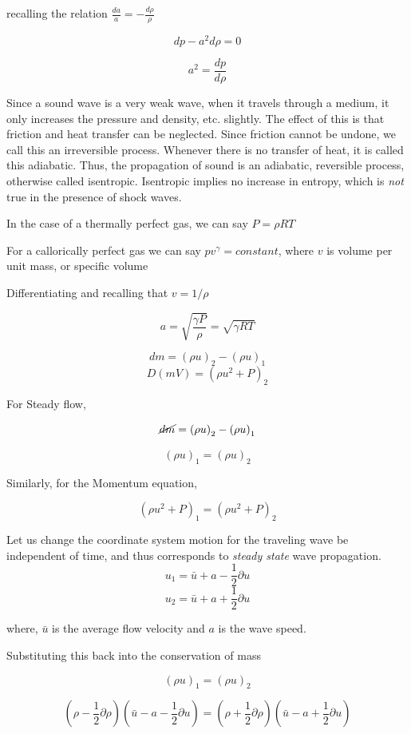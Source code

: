 recalling the relation $\frac{da}{a} = -\frac{d \rho}{\rho}$

\[dp - a^2 d \rho = 0\]

                       \[a^2 = \frac{dp}{d\rho}\]

Since a sound wave is a very weak wave, when it travels through a medium, it only increases the pressure and density, etc. slightly. The effect of this is that friction  and heat transfer can be neglected. Since friction cannot be undone, we call this an irreversible process. Whenever there is no transfer of heat, it is called this adiabatic. Thus, the propagation of sound is an adiabatic, reversible process, otherwise called isentropic. Isentropic implies no increase in entropy, which is \textit{not} true in the presence of shock waves.

In the case of a thermally perfect gas, we can say $P = \rho R T$

For a callorically perfect gas we can say $pv^{\gamma} = constant$, where $v$ is volume per unit mass, or specific volume

Differentiating and recalling that $v = 1/\rho$

\[a = \sqrt{\frac{\gamma P}{\rho}} = \sqrt{\gamma R T}\]


\[dm = \left( \rho u\right)_2 - \left(\rho u\right)_1\]
\[D(mV) = \left(\rho u^2 + P \right)_2\]

For Steady flow,

\[\cancel{dm} = \left( \rho u\right)_2 - \left(\rho u\right)_1\]

\[ \left( \rho u\right)_1 = \left(\rho u\right)_2\]

Similarly, for the Momentum equation,

\[\left(\rho u^2 + P\right)_1 = \left(\rho u^2 + P\right)_2\]

Let us change the coordinate system motion for the traveling wave be independent of time, and thus corresponds to \textit{steady state} wave propagation. 
\[ u_1 = \bar{u} + a - \frac{1}{2} \partial u \]
\[ u_2 = \bar{u} + a + \frac{1}{2} \partial u \]


where, $\bar{u}$ is the average flow velocity and $a$ is the wave speed.


Substituting this back into the conservation of mass

\[\left(\rho u\right)_1 = \left(\rho u\right)_2 \]

\[ 
\left( \rho    - \frac{1}{2}\partial \rho \right) 
\left( \bar{u} - a - \frac{1}{2}\partial u\right) = 
\left( \rho    + \frac{1}{2}\partial \rho \right) 
\left( \bar{u} - a + \frac{1}{2}\partial u\right) 
\]

